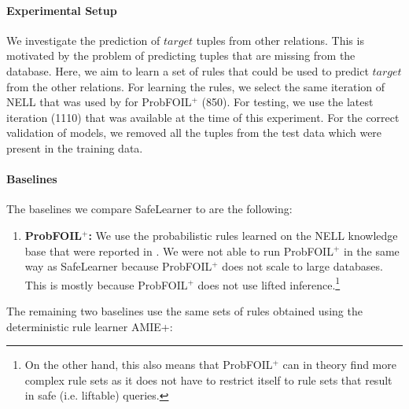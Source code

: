 \documentclass[akbc,twoside,11pt]{article}
\newcommand{\algorithmname}{SafeLearner\xspace}
\begin{document}
\paragraph{Experimental Setup} We investigate the prediction of $target$ tuples from other relations. This is motivated by the problem of predicting tuples that are missing from the database. Here, we aim to learn a set of rules that could be used to predict $target$ from the other relations.
For learning the rules, we select the same iteration of NELL that was used by \citet{DBLP:conf/ijcai/RaedtDTBV15} for ProbFOIL$^+$ (850). For testing, we use the latest iteration (1110) that was available at the time of this experiment. For the correct validation of models, we removed all the tuples from the test data which were present in the training data.

\paragraph{Baselines} The baselines we compare \algorithmname to are the following:

\begin{enumerate}
    \item {\bf ProbFOIL$^+$:} We use the probabilistic rules learned on the NELL knowledge base that were reported in \cite{DBLP:conf/ijcai/RaedtDTBV15}. We were not able to run ProbFOIL$^+$ in the same way as \algorithmname because ProbFOIL$^+$ does not scale to large databases. This is mostly because ProbFOIL$^+$ does not use lifted inference.\footnote{On the other hand, this also means that ProbFOIL$^+$ can in theory find more complex rule sets as it does not have to restrict itself to rule sets that result in safe (i.e. liftable) queries.}
\end{enumerate}


\noindent The remaining two baselines use the same sets of rules obtained using the deterministic rule learner AMIE+:
\end{document}
